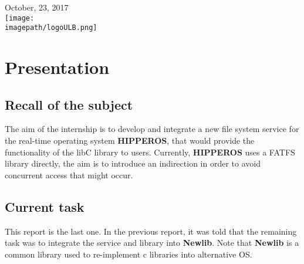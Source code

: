\documentclass[12pt]{article}
\begin{document}
\begin{titlepage}

{\large October, 23, 2017 }\\[2cm] %



\texttt{[image: \\imagepath/logoULB.png]}\\[1cm] 
 

\vfill %

\end{titlepage}

\newpage


\pagestyle{fancy}
\fancyhf{}
\setlength\headheight{15pt}
\fancyhead[R]{}
\fancyfoot[R]{\thepage}

\newpage

\section{Presentation}
\subsection{Recall of the subject}
The aim of the internship is to develop and integrate a new file system 
service for the real-time operating system \textbf{HIPPEROS}, 
that would provide the functionality of the libC library to users.
Currently, \textbf{HIPPEROS} uses a FATFS library directly, the aim is to introduce an indirection in order to 
avoid concurrent access that might occur.

\subsection{Current task}
This report is the last one. In the previous report, it was told that the 
remaining task was to integrate the service and library into \textbf{Newlib}.
Note that \textbf{Newlib} is a common library used to re-implement c 
libraries into alternative OS.
\end{document}
